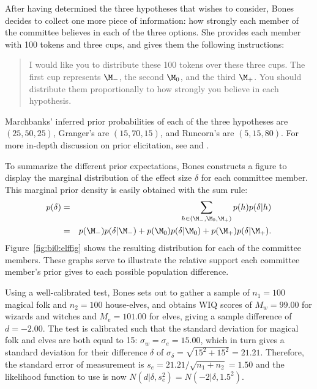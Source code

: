 After having determined the three hypotheses that \wishes{} wishes to consider, Bones decides to collect one more piece of information: how strongly each member of the committee believes in each of the three options. She provides each member with 100 tokens and three cups, and gives them the following instructions: 
\begin{quote}
I would like you to distribute these 100 tokens over these three cups. The first cup represents $\M_-$, the second $\M_0$, and the third $\M_+$. You should distribute them proportionally to how strongly you believe in each hypothesis.
\end{quote}
Marchbanks' inferred prior probabilities of each of the three hypotheses are $(25,50,25)$, Granger's are $(15,70,15)$, and Runcorn's are $(5,15,80)$. {For more in-depth discussion on prior elicitation, see  and .}

To summarize the different prior expectations, Bones constructs a figure to display the marginal distribution of the effect size $\delta$ for each committee member. This marginal prior density is easily obtained with the sum rule: \begin{eqnarray*} p(\delta) &=& \sum_{h \in \left(\M_-,\M_0,\M_+\right)}p(h)p(\delta|h) \\ &=& p(\M_-)p(\delta|\M_-) + p(\M_0)p(\delta|\M_0) + p(\M_+)p(\delta|\M_+). \end{eqnarray*} Figure~\ref{fig:bi0:elffig} shows the resulting distribution for each of the committee members. These graphs serve to illustrate the relative support each committee member's prior gives to each possible population difference.

Using a well-calibrated test, Bones sets out to gather a sample of $n_1 = 100$ magical folk and $n_2 = 100$ house-elves, and obtains WIQ scores of $M_w = 99.00$ for wizards and witches and $M_e = 101.00$ for elves, giving a sample difference of $d = -2.00$. The test is calibrated such that the standard deviation for magical folk and elves are both equal to 15: $\sigma_w = \sigma_e = 15.00$, which in turn gives a standard deviation for their difference $\delta$ of $\sigma_\delta = \sqrt{15^2+15^2} = 21.21$. Therefore, the standard error of measurement is $s_e = 21.21/\sqrt{n_1+n_2}=1.50$ and the likelihood function to use is now $N\left(d|\delta,s_e^2\right) = N\left(-2|\delta,1.5^2\right)$.

